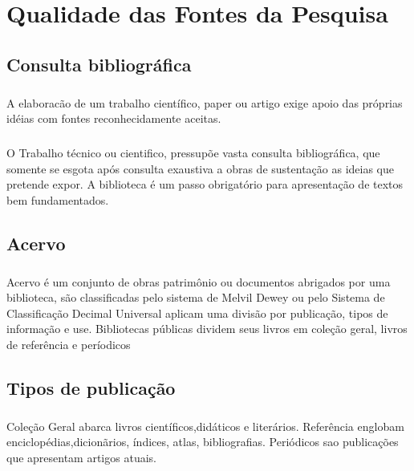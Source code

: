 \chapter{Qualidade das Fontes da Pesquisa}

\section{Consulta bibliográfica}

\paragraph{}
A elaboracão de um trabalho científico, paper ou artigo exige apoio das próprias idéias com fontes reconhecidamente aceitas.
\paragraph{}
O Trabalho técnico ou cientifico, pressupõe vasta consulta bibliográfica, que somente se esgota após consulta exaustiva a obras de sustentação as ideias que pretende expor.
A biblioteca é um passo obrigatório para apresentação de textos bem fundamentados.
 
\section{Acervo}
 
\paragraph{}
Acervo é um conjunto de obras patrimônio ou documentos abrigados por uma biblioteca, são classificadas pelo sistema de Melvil Dewey ou pelo Sistema de Classificação Decimal Universal aplicam uma divisão por publicação, tipos de informação e use. Bibliotecas públicas dividem seus livros em coleção geral, livros de referência e períodicos

\section{Tipos de publicação}

\paragraph{}

Coleção Geral abarca livros científicos,didáticos e literários.
Referência englobam enciclopédias,dicionãrios, índices, atlas, bibliografias.
Periódicos sao publicações que apresentam artigos atuais.

